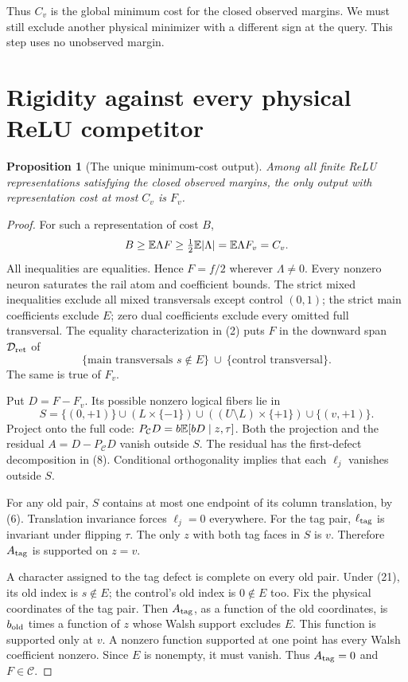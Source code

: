 \documentclass[11pt]{article}
\newtheorem{proposition}[theorem]{Proposition}
\begin{document}
Thus $C_v$ is the global minimum cost for the closed observed margins.
We must still exclude another physical minimizer with a different sign
at the query. This step uses no unobserved margin.

\section{Rigidity against every physical ReLU competitor}
\begin{proposition}[The unique minimum-cost output]\label{prop:unique}
Among all finite ReLU representations satisfying the closed observed
margins, the only output with representation cost at most $C_v$ is $F_v$.
\end{proposition}
\begin{proof}
For such a representation of cost $B$,
\[
 B\ge\mathbb E\Lambda F\ge\tfrac12\mathbb E|\Lambda|
                              =\mathbb E\Lambda F_v=C_v.
\]
All inequalities are equalities. Hence $F=f/2$ wherever $\Lambda\ne0$.
Every nonzero neuron saturates the rail atom and coefficient bounds.
The strict mixed inequalities exclude all mixed transversals except
control $(0,1)$; the strict main coefficients exclude $E$; zero dual
coefficients exclude every omitted full transversal. The equality
characterization in (2) puts $F$ in the downward span
$\mathcal D_{\rm ret}$ of
\[
 \{\text{main transversals }s\notin E\}
                         \ \cup\ \{\text{control transversal}\}. \tag{21}
\]
The same is true of $F_v$.

Put $D=F-F_v$. Its possible nonzero logical fibers lie in
\[
 S=\{(0,+1)\}\cup(L\times\{-1\})
       \cup((U\setminus L)\times\{+1\})\cup\{(v,+1)\}.    \tag{22}
\]
Project onto the full code:
$P_{\mathcal C}D=b\mathbb E[bD\mid z,\tau]$.
Both the projection and the residual $A=D-P_{\mathcal C}D$ vanish
outside $S$. The residual has the first-defect decomposition in (8).
Conditional orthogonality implies that each $\ell_j$ vanishes outside $S$.

For any old pair, $S$ contains at most one endpoint of its column
translation, by (6). Translation invariance forces $\ell_j=0$
everywhere. For the tag pair, $\ell_{\rm tag}$ is invariant under
flipping $\tau$. The only $z$ with both tag faces in $S$ is $v$.
Therefore $A_{\rm tag}$ is supported on $z=v$.

A character assigned to the tag defect is complete on every old pair.
Under (21), its old index is $s\notin E$; the control's old index is
$0\notin E$ too. Fix the physical coordinates of the tag pair.
Then $A_{\rm tag}$, as a function of the old coordinates, is $b_{\rm old}$
times a function of $z$ whose Walsh support excludes $E$.
This function is supported only at $v$. A nonzero function supported
at one point has every Walsh coefficient nonzero. Since $E$ is
nonempty, it must vanish. Thus $A_{\rm tag}=0$ and $F\in\mathcal C$.


\end{proof}
\end{document}
